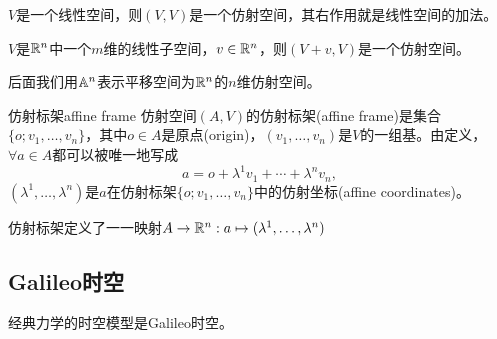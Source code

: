 \begin{example}{}{}
    $V$是一个线性空间，则$(V,V)$是一个仿射空间，其右作用就是线性空间的加法。

    $V$是$\RR^n$中一个$m$维的线性子空间，$v\in\RR^n$，则$(V+v,V)$是一个仿射空间。
\end{example}

后面我们用$\AA^n$表示平移空间为$\RR^n$的$n$维仿射空间。

\begin{definition}{仿射标架}{affine frame}
    仿射空间$(A,V)$的仿射标架(affine frame)是集合$\{o;v_1,\ldots,v_n\}$，其中$o\in A$是原点(origin)，$(v_1,\ldots,v_n)$是$V$的一组基。由定义，$\forall a\in A$都可以被唯一地写成
    \begin{equation}
        a=o+\lambda^1v_1+\cdots+\lambda^nv_n,
    \end{equation}
    $(\lambda^1,\ldots,\lambda^n)$是$a$在仿射标架$\{o;v_1,\ldots,v_n\}$中的仿射坐标(affine coordinates)。
\end{definition}
仿射标架定义了一一映射$A\to\RR^n:a\mapsto(\lambda^1,\ldots,\lambda^n)$

\subsection{Galileo时空}

经典力学的时空模型是Galileo时空。

